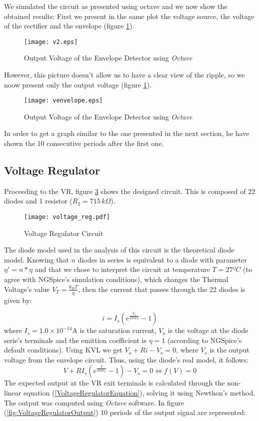We simulated the circuit as presented using octave and we now show the obtained results:
First we present in the same plot the voltage source, the voltage of the rectifier and the envelope (figure \ref{fig:venvelope1}).
\begin{figure}[h!]
  \centering
  \texttt{[image: v2.eps]}
  \caption{Output Voltage of the Envelope Detector using \emph{Octave}}
  \label{fig:venvelope1}
\end{figure}
However, this picture doesn't allow us to have a clear view of the ripple, so we noow present only the output voltage (figure \ref{fig:venvelope1}).
\begin{figure}[H]
  \centering
  \texttt{[image: venvelope.eps]}
  \caption{Output Voltage of the Envelope Detector using \emph{Octave}}
  \label{fig:venvelope2}
\end{figure}
In order to get a graph similar to the one presented in the next section, he have shown the 10 consecutive periods after the first one.







\subsection{Voltage Regulator}

Proceeding to the VR, figure \ref{fig:voltage regulator} shows the designed circuit. This is composed of 22 diodes and 1 resistor ($R_2=715 \, k\Omega$).
\begin{figure}[h!]
  \centering
  \texttt{[image: voltage\_reg.pdf]}
  \caption{Voltage Regulator Circuit}
  \label{fig:voltage regulator}
\end{figure}

The diode model used in the analysis of this circuit is the theoretical diode model. Knowing that $n$ diodes in series is equivalent to a diode with parameter $\eta'=n*\eta$ and that we chose to
interpret the circuit at temperature $T=27ºC$ (to agree with NGSpice's simulation conditions), which changes the Thermal Voltage's value $V_T=\frac{k_BT}{q}$, then the current that passes through the 22 diodes is given by:

\begin{equation}
i=I_s(e^{\frac{V_o}{22 \eta V_T}}-1)
\end{equation}
where $I_s=1.0\times 10^{-14}$A is the saturation current, $V_o$ is the voltage at the diode serie's terminals and the emittion coefficient is $\eta=1$ (according to NGSpice's default conditions).
Using KVL we get $V_o+Ri-V_s=0$, where $V_s$ is the output voltage from the envelope circuit. Thus, using the diode's real model, it follows:
\begin{equation}
  V+RI_s(e^{\frac{V}{22 \eta V_T}}-1)-V_s=0 \Leftrightarrow f(V)=0
  \label{VoltageRegulatorEquation}
\end{equation}
The expected output at the VR exit terminals is calculated through the non-linear equation (\ref{VoltageRegulatorEquation}), solving it using Newthon's method.
The output was computed using \textit{Octave} software. In figure (\ref{fig:VoltageRegulatorOutput}) 10 periods of the output signal are represented:

